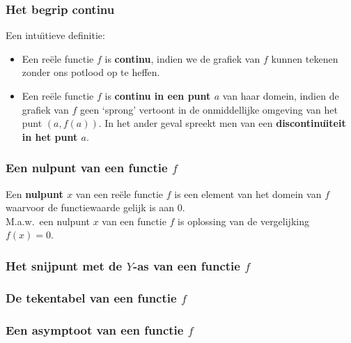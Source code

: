 \begin{frame}
\frametitle{Het begrip continu} 
\pause
\begin{definitie} Een intu\"{\i}tieve definitie:
	\pause
	\begin{itemize}
		\item<+-> Een re\"ele functie $f$ is {\bfseries continu}, indien we de grafiek van $f$ kunnen tekenen zonder ons potlood op te heffen. \\
		\item<+-> Een re\"ele functie $f$ is {\bfseries continu in een punt $a$} van haar domein, indien de grafiek van $f$ geen `sprong' vertoont in de onmiddellijke omgeving van het punt $(a,f(a))$. In het ander geval spreekt men van een {\bfseries discontinu\"{\i}teit in het punt $a$}. 
	\end{itemize}
\end{definitie}
\end{frame}

\begin{frame}
\frametitle{Een nulpunt van een functie $f$}
\pause
\begin{definitie}
Een {\bfseries nulpunt $x$} van een re\"ele functie $f$ is een element van het domein van $f$ waarvoor de functiewaarde gelijk is aan 0.\\ %
M.a.w.\ een nulpunt $x$ van een functie $f$ is oplossing van de vergelijking $f(x)=0$.
\end{definitie}
\end{frame}

\begin{frame}
\frametitle{Het snijpunt met de $Y$-as van een functie $f$}
\pause
\begin{definitie}

\end{definitie}
\end{frame}

\begin{frame}
\frametitle{De tekentabel van een functie $f$}
\pause
\begin{definitie}
	
\end{definitie}
\end{frame}

\begin{frame}
\frametitle{Een asymptoot van een functie $f$}
\pause
\begin{definitie}
	
\end{definitie}
\end{frame}


